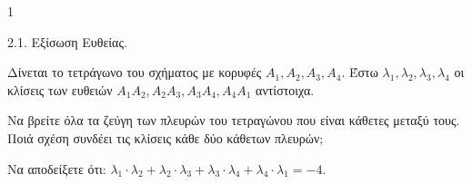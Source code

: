 \begin{ylh}{1}
    \item 2.1. Εξίσωση Ευθείας.
\end{ylh}
\begin{figure}
\end{figure}
Δίνεται το τετράγωνο του σχήματος με κορυφές $A_1, A_2, A_3, A_4$. Έστω $\lambda_1, \lambda_2, \lambda_3, \lambda_4$ οι κλίσεις των ευθειών $A_1A_2, A_2A_3, A_3A_4, A_4A_1$ αντίστοιχα.
\begin{alist}
\item Να βρείτε όλα τα ζεύγη των πλευρών του τετραγώνου που είναι κάθετες μεταξύ τους. Ποιά σχέση συνδέει τις κλίσεις κάθε δύο κάθετων πλευρών; 
\item Να αποδείξετε ότι: $\lambda_1 \cdot \lambda_2 + \lambda_2 \cdot \lambda_3 + \lambda_3 \cdot \lambda_4 + \lambda_4 \cdot \lambda_1 = -4$. 
\end{alist}